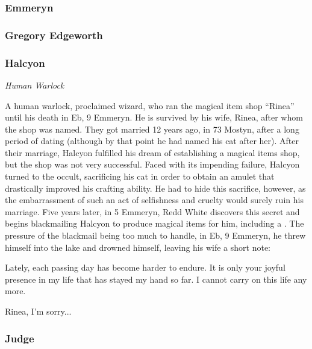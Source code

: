 \subsubsection{Emmeryn}
\label{people:emmeryn}

\subsubsection{Gregory Edgeworth}
\label{people:gregory}

\subsubsection{Halcyon}
\label{people:halcyon}
\begin{center}
\textit{Human Warlock}
\end{center}
A human warlock, proclaimed wizard, who ran the magical item shop ``Rinea'' until his death in Eb, 9 Emmeryn. He is survived by his wife, Rinea, after whom the shop was named. They got married 12 years ago, in 73 Mostyn, after a long period of dating (although by that point he had named his cat after her). After their marriage, Halcyon fulfilled his dream of establishing a magical items shop, but the shop was not very successful. Faced with its impending failure, Halcyon turned to the occult, sacrificing his cat in order to obtain an amulet that drastically improved his crafting ability. He had to hide this sacrifice, however, as the embarrassment of such an act of selfishness and cruelty would surely ruin his marriage. Five years later, in 5 Emmeryn, Redd White discovers this secret and begins blackmailing Halcyon to produce magical items for him, including a . The pressure of the blackmail being too much to handle, in Eb, 9 Emmeryn, he threw himself into the lake and drowned himself, leaving his wife a short note:
\begin{center}
Lately, each passing day has become harder to endure. It is only your joyful presence in my life that has stayed my hand so far. I cannot carry on this life any more. 

Rinea, I'm sorry...
\end{center}


\subsubsection{Judge}
\label{people:judge}

